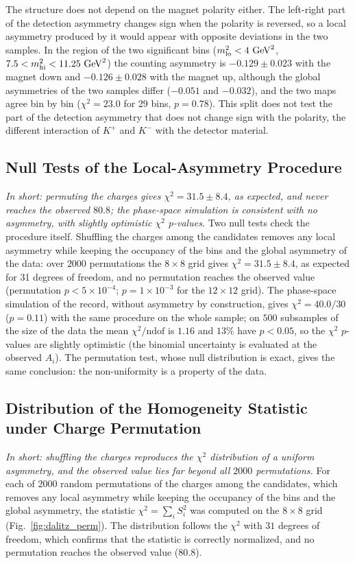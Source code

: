 The structure does not depend on the magnet polarity either. The left-right part of the detection asymmetry changes sign when the polarity is reversed, so a local asymmetry produced by it would appear with opposite deviations in the two samples. In the region of the two significant bins ($m^2_{\mathrm{lo}}<4\,\,\text{Ge\hspace{-.08em}V}^2$, $7.5<m^2_{\mathrm{hi}}<11.25\,\,\text{Ge\hspace{-.08em}V}^2$) the counting asymmetry is $-0.129\pm0.023$ with the magnet down and $-0.126\pm0.028$ with the magnet up, although the global asymmetries of the two samples differ ($-0.051$ and $-0.032$), and the two maps agree bin by bin ($\chi^2=23.0$ for 29 bins, $p=0.78$). This split does not test the part of the detection asymmetry that does not change sign with the polarity, the different interaction of $K^+$ and $K^-$ with the detector material.

\subsection{Null Tests of the Local-Asymmetry Procedure}
\label{sec:dalitz_null}
\emph{In short: permuting the charges gives $\chi^2=31.5\pm8.4$, as expected, and never reaches the observed $80.8$; the phase-space simulation is consistent with no asymmetry, with slightly optimistic $\chi^2$ $p$-values.}
Two null tests check the procedure itself. Shuffling the charges among the candidates removes any local asymmetry while keeping the occupancy of the bins and the global asymmetry of the data: over $2000$ permutations the $8\times8$ grid gives $\chi^2=31.5\pm8.4$, as expected for 31 degrees of freedom, and no permutation reaches the observed value (permutation $p<5\times10^{-4}$; $p=1\times10^{-3}$ for the $12\times12$ grid). The phase-space simulation of the record, without asymmetry by construction, gives $\chi^2=40.0/30$ ($p=0.11$) with the same procedure on the whole sample; on $500$ subsamples of the size of the data the mean $\chi^2/\mathrm{ndof}$ is $1.16$ and $13\%$ have $p<0.05$, so the $\chi^2$ $p$-values are slightly optimistic (the binomial uncertainty is evaluated at the observed $A_i$). The permutation test, whose null distribution is exact, gives the same conclusion: the non-uniformity is a property of the data.

\subsection{Distribution of the Homogeneity Statistic under Charge Permutation}
\label{app:dalitz_perm}
\emph{In short: shuffling the charges reproduces the $\chi^2$ distribution of a uniform asymmetry, and the observed value lies far beyond all $2000$ permutations.}
For each of $2000$ random permutations of the charges among the candidates, which removes any local asymmetry while keeping the occupancy of the bins and the global asymmetry, the statistic $\chi^2=\sum_iS_i^2$ was computed on the $8\times8$ grid (Fig.~\ref{fig:dalitz_perm}). The distribution follows the $\chi^2$ with $31$ degrees of freedom, which confirms that the statistic is correctly normalized, and no permutation reaches the observed value ($80.8$).

